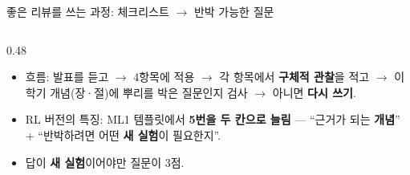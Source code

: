 \documentclass[aspectratio=169,11pt]{beamer}
\begin{document}
\begin{frame}{좋은 리뷰를 쓰는 과정: 체크리스트 $\to$ 반박 가능한 질문}
  \begin{columns}[T]
    \begin{column}{0.48\textwidth}
      \begin{itemize}
        \item 흐름: 발표를 듣고 $\to$ 4항목에 적용 $\to$ 각 항목에서
          \textbf{구체적 관찰}을 적고 $\to$ 이 학기 개념(장·절)에
          뿌리를 박은 질문인지 검사 $\to$ 아니면 \textbf{다시 쓰기}.
        \item RL 버전의 특징: ML1 템플릿에서 \textbf{5번을 두 칸으로
          늘림} --- ``근거가 되는 \textbf{개념}'' + ``반박하려면 어떤
          \textbf{새 실험}이 필요한지''.
        \item 답이 \textbf{새 실험}이어야만 질문이 3점.
      \end{itemize}
    \end{column}
  \end{columns}
\end{frame}
\end{document}
